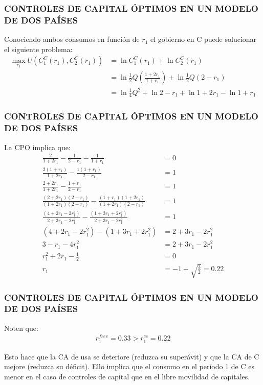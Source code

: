 \documentclass[10pt, xcolor=table, x11names]{beamer}
\begin{document}
\begin{frame}[label=14]
	\frametitle{{\normalsize CONTROLES DE CAPITAL ÓPTIMOS EN UN MODELO DE DOS PAÍSES} {}}
	Conociendo ambos consumos en función de $r_{1}$ el gobierno en C puede solucionar el siguiente problema:
	\begin{align}
	\max_{r_{1}}U(C_{1}^{C}(r_{1}), C_{2}^{C}(r_{1}))&= \ln{C_{1}^{C}(r_{1})}+ \ln{C_{2}^{C}(r_{1})}	\nonumber \\
	&=\ln{\frac{1}{2}Q(\frac{1+2r_{1}}{1+r_{1}})}+\ln{\frac{1}{2}Q(2-r_{1})} \nonumber \\
	&=\ln{\frac{1}{4}Q^{2}}+\ln{2-r_{1}}+\ln{1+2r_{1}}-\ln{1+r_{1}}  \nonumber 
	\end{align}
\end{frame}

\begin{frame}[label=15]
	\frametitle{{\normalsize CONTROLES DE CAPITAL ÓPTIMOS EN UN MODELO DE DOS PAÍSES} {}}
	La CPO implica que:
	\begin{align}
	\frac{2}{1+2r_{1}}-\frac{1}{2-r_{1}}-\frac{1}{1+r_{1}}&=0\nonumber \\
	\frac{2(1+r_{1})}{1+2r_{1}}-\frac{1(1+r_{1})}{2-r_{1}}&=1\nonumber \\
	\frac{2+2r_{1}}{1+2r_{1}}-\frac{1+r_{1}}{2-r_{1}}&=1\nonumber \\
	\frac{(2+2r_{1})(2-r_{1})}{(1+2r_{1})(2-r_{1})}-\frac{(1+r_{1})(1+2r_{1})}{(1+2r_{1})(2-r_{1})}&=1\nonumber \\
	\frac{(4+2r_{1}-2r_{1}^{2})}{2+3r_{1}-2r_{1}^{2}}-\frac{(1+3r_{1}+2r_{1}^{2})}{2+3r_{1}-2r_{1}^{2}}&=1\nonumber \\
	(4+2r_{1}-2r_{1}^{2})-(1+3r_{1}+2r_{1}^{2})&=2+3r_{1}-2r_{1}^{2}\nonumber \\
	3-r_{1}-4r_{1}^{2}&=2+3r_{1}-2r_{1}^{2}\nonumber \\
	r_{1}^{2}+2r_{1}-\frac{1}{2}&=0\nonumber \\
	r_{1}&=-1 +\sqrt{\frac{3}{2}}=0.22
	\end{align}
\end{frame}

\begin{frame}[label=15]
	\frametitle{{\normalsize CONTROLES DE CAPITAL ÓPTIMOS EN UN MODELO DE DOS PAÍSES} {}}
	Noten que:
		\begin{align}
		r_{1}^{free}=0.33>r_{1}^{cc}=0.22
		\end{align}

Esto hace que la CA de usa se deteriore (reduzca su superávit) y que la CA de C mejore (reduzca su déficit). Ello implica que el consumo en el período 1 de C es menor en el caso de controles de capital que en el libre movilidad de capitales. \\

\end{frame}
\end{document}
